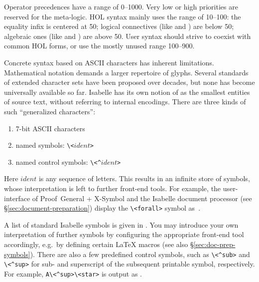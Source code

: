 \begin{isabellebody}
\begin{isamarkuptext}
  Operator precedences have a range of 0--1000.  Very low or high
  priorities are reserved for the meta-logic.  HOL syntax mainly uses
  the range of 10--100: the equality infix  is centered at
  50; logical connectives (like  and ) are
  below 50; algebraic ones (like  and ) are
  above 50.  User syntax should strive to coexist with common HOL
  forms, or use the mostly unused range 100--900.%
\end{isamarkuptext}%
\isamarkuptrue%
%
\isamarkuptrue%
%
\begin{isamarkuptext}%
Concrete syntax based on ASCII characters has inherent limitations.
  Mathematical notation demands a larger repertoire of glyphs.
  Several standards of extended character sets have been proposed over
  decades, but none has become universally available so far.  Isabelle
  has its own notion of  as the smallest entities of
  source text, without referring to internal encodings.  There are
  three kinds of such ``generalized characters'':

  \begin{enumerate}

  \item 7-bit ASCII characters

  \item named symbols: \verb,\,\verb,<,$ident$\verb,>,

  \item named control symbols: \verb,\,\verb,<^,$ident$\verb,>,

  \end{enumerate}

  Here $ident$ is any sequence of letters. 
  This results in an infinite store of symbols, whose
  interpretation is left to further front-end tools.  For example, the
  user-interface of Proof~General + X-Symbol and the Isabelle document
  processor (see \S\ref{sec:document-preparation}) display the
  \verb,\,\verb,<forall>, symbol as~.

  A list of standard Isabelle symbols is given in
  \cite{isabelle-isar-ref}.  You may introduce your own
  interpretation of further symbols by configuring the appropriate
  front-end tool accordingly, e.g.\ by defining certain {\LaTeX}
  macros (see also \S\ref{sec:doc-prep-symbols}).  There are also a
  few predefined control symbols, such as \verb,\,\verb,<^sub>, and
  \verb,\,\verb,<^sup>, for sub- and superscript of the subsequent
  printable symbol, respectively.  For example, \verb,A\<^sup>\<star>, is
  output as .


\end{isamarkuptext}
\end{isabellebody}
